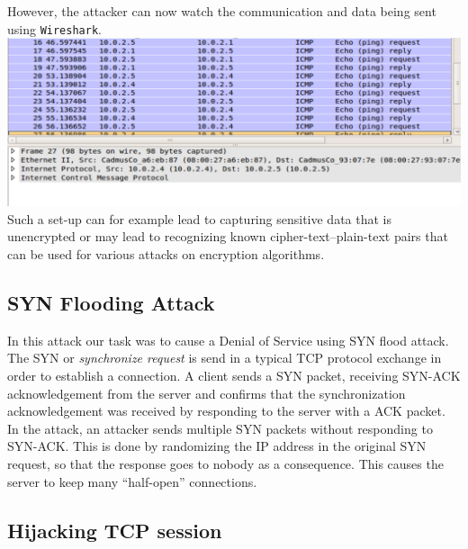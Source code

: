 \documentclass[12pt, a4paper, pdflatex]{article}
\begin{document}
However, the attacker can now watch the communication and data being sent using \texttt{Wireshark}.\\

\includegraphics[width=.95\textwidth]{gfx/imcp-shark}\\

Such a set-up can for example lead to capturing sensitive data that is unencrypted or may lead to recognizing known cipher-text--plain-text pairs that can be used for various attacks on encryption algorithms.

\subsection{SYN Flooding Attack}
In this attack our task was to cause a Denial of Service using SYN flood attack. The SYN or \emph{synchronize request} is send in a typical TCP protocol exchange in order to establish a connection. A client sends a SYN packet, receiving SYN-ACK acknowledgement from the server and confirms that the synchronization acknowledgement was received by responding to the server with a ACK packet.\\

In the attack, an attacker sends multiple SYN packets without responding to SYN-ACK. This is done by randomizing the IP address in the original SYN request, so that the response goes to nobody as a consequence. This causes the server to keep many ``half-open'' connections.\\

\subsection{Hijacking TCP session}
\end{document}
